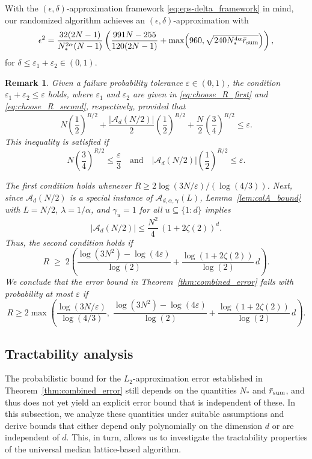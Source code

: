 \documentclass[a4paper,11pt]{article}
\newtheorem{remark}[theorem]{Remark}
\newcommand{\bsgamma}{\boldsymbol{\gamma}}
\newcommand{\Acal}{\mathcal{A}}
\begin{document}
With the $(\epsilon,\delta)$-approximation framework \eqref{eq:eps-delta_framework} in mind, our randomized algorithm achieves an $(\epsilon,\delta)$-approximation with
\[
\epsilon^2 = \frac{32(2N-1)}{N^{2\alpha}_*(N-1)}
  \left(\frac{991N-255}{120(2N-1)}
  + \max\!\left(960,\sqrt{240 N^{4\alpha}_*\Bar{r}_{\mathrm{sum}}}\right)\right),
\]
for $\delta \le \varepsilon_1+\varepsilon_2 \in (0,1)$.

\begin{remark}

Given a failure probability tolerance $\varepsilon \in (0,1)$, the condition $\varepsilon_1+\varepsilon_2 \leq \varepsilon$ holds, where $\varepsilon_1$ and $\varepsilon_2$ are given in \eqref{eq:choose_R_first} and \eqref{eq:choose_R_second}, respectively, provided that
\[
N\left(\frac{1}{2}\right)^{R/2} 
+ \frac{|\mathcal{A}_d(N/2)|}{2}\left(\frac{1}{2}\right)^{R/2} 
+ \frac{N}{2}\left(\frac{3}{4}\right)^{R/2} \leq \varepsilon.
\]
This inequality is satisfied if
\[
N\left(\frac{3}{4}\right)^{R/2} \leq \frac{\varepsilon}{3} 
\quad \text{and} \quad  
|\mathcal{A}_d(N/2)|\left(\frac{1}{2}\right)^{R/2} \leq \varepsilon.
\]

The first condition holds whenever $R \geq 2\log (3N/\varepsilon)/(\log (4/3))$.
Next, since $\Acal_{d}(N/2)$ is a special instance of $\Acal_{d,\alpha,\bsgamma}(L)$, Lemma~\ref{lem:calA_bound} with $L=N/2$, $\lambda=1/\alpha$, and $\gamma_u=1$ for all $u\subseteq \{1{:}d\}$ implies
\[
|\Acal_{d}(N/2)| \leq \frac{N^2}{4}\,(1+2\zeta(2))^{d}.
\]
Thus, the second condition holds if
\[
R \;\geq\; 2\left( \frac{\log (3N^2)-\log (4\varepsilon)}{\log (2)} + \frac{\log(1+2\zeta(2))}{\log (2)}\,d\right).
\]
We conclude that the error bound in Theorem~\ref{thm:combined_error} fails with probability at most $\varepsilon$ if
\begin{equation}\label{eq:R_large_enough}
    R \geq 2\max\left( \frac{\log (3N/\varepsilon)}{\log (4/3)}, \; \frac{\log (3N^2)-\log (4\varepsilon)}{\log (2)} + \frac{\log (1+2\zeta(2))}{\log (2)}\,d \right).
\end{equation}
\end{remark}

\subsection{Tractability analysis}\label{subsec:tractability}

The probabilistic bound for the $L_2$-approximation error established in Theorem~\ref{thm:combined_error} still depends on the quantities $N_*$ and $\Bar{r}_{\mathrm{sum}}$, and thus does not yet yield an explicit error bound that is independent of these. In this subsection, we analyze these quantities under suitable assumptions and derive bounds that either depend only polynomially on the dimension $d$ or are independent of $d$. This, in turn, allows us to investigate the tractability properties of the universal median lattice-based algorithm.
\end{document}
